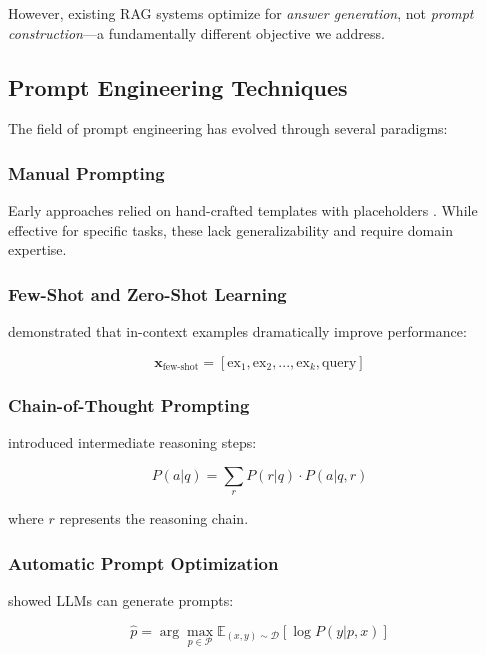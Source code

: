 \documentclass[11pt,a4paper]{article}
\begin{document}
However, existing RAG systems optimize for \textit{answer generation}, not \textit{prompt construction}—a fundamentally different objective we address.

\subsection{Prompt Engineering Techniques}

The field of prompt engineering has evolved through several paradigms:

\subsubsection{Manual Prompting}
Early approaches relied on hand-crafted templates with placeholders \cite{liu2023pretrain}. While effective for specific tasks, these lack generalizability and require domain expertise.

\subsubsection{Few-Shot and Zero-Shot Learning}
\citet{brown2020gpt3} demonstrated that in-context examples dramatically improve performance:

\begin{equation}
\mathbf{x}_{\text{few-shot}} = [\text{ex}_1, \text{ex}_2, ..., \text{ex}_k, \text{query}]
\end{equation}

\subsubsection{Chain-of-Thought Prompting}
\citet{wei2022cot} introduced intermediate reasoning steps:

\begin{equation}
P(a|q) = \sum_r P(r|q) \cdot P(a|q,r)
\end{equation}

\noindent where $r$ represents the reasoning chain.

\subsubsection{Automatic Prompt Optimization}
\citet{zhou2023llmpe} showed LLMs can generate prompts:

\begin{equation}
\hat{p} = \arg\max_{p \in \mathcal{P}} \mathbb{E}_{(x,y) \sim \mathcal{D}}[\log P(y|p, x)]
\end{equation}
\end{document}
